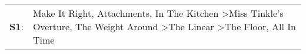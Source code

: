\begin{supertabular}{p{0.03\textwidth}p{0.92\textwidth}}
 \textbf{S1}:  &  Make It Right\textsuperscript{}, \enspace Attachments\textsuperscript{}, \enspace In The Kitchen\textsuperscript{} \textgreater \enspace Miss Tinkle's Overture\textsuperscript{}, \enspace The Weight Around\textsuperscript{} \textgreater \enspace The Linear\textsuperscript{} \textgreater \enspace The Floor\textsuperscript{}, \enspace All In Time\textsuperscript{}  \enspace  \\
\end{supertabular}
